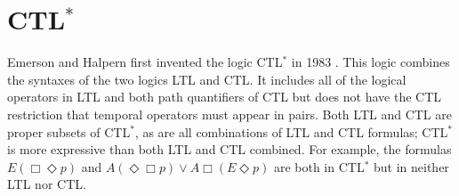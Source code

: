 \documentclass{elsarticle} %
\newcommand{\pspic}[2]{\scalebox{#1}{\texttt{[image: \#2]}}}
\begin{document}








\section{CTL$^*$}

Emerson and Halpern first invented the logic CTL$^*$ in 1983 \cite{EH86}. This logic combines the syntaxes of the two logics LTL and CTL. It includes all of the logical operators in LTL and both path quantifiers of CTL but does not have the CTL restriction that temporal operators must appear in pairs. Both LTL and CTL are proper subsets of CTL$^*$, as are all combinations of LTL and CTL formulas; CTL$^*$ is more expressive than both LTL and CTL combined. For example, the formulas $E(\Box\Diamond p)$ and $A(\Diamond\Box p) \vee A\Box(E\Diamond p)$ are both in CTL$^*$ but in neither LTL nor CTL.
\end{document}
